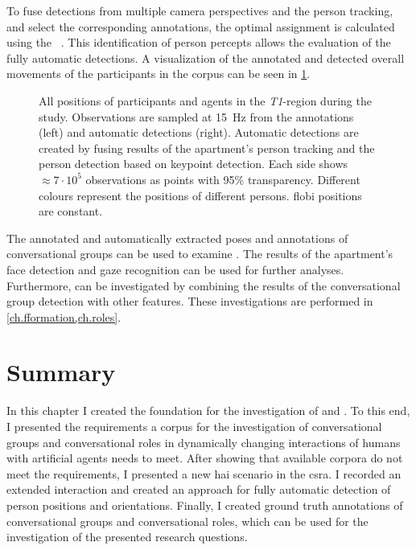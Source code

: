 To fuse detections from multiple camera perspectives and the person tracking, and select the corresponding annotations, the optimal assignment is calculated using the ~.
This identification of person percepts allows the evaluation of the fully automatic detections.
A visualization of the annotated and detected overall movements of the participants in the corpus can be seen in \cref{fig:group-person-movement}.
\begin{figure}[htb]
    \centering
    \def\svgwidth{1.0\textwidth}
    
    \caption[Movements in annotation and detection.]{\label{fig:group-person-movement}
    All positions of participants and agents in the \emph{T1}-region during the study.
    Observations are sampled at \SI{15}{\Hz} from the annotations (left) and automatic detections (right).
    Automatic detections are created by fusing results of the \gls{apartment}'s person tracking and the person detection based on  keypoint detection.
    Each side shows \(\approx7\cdot10^5\) observations as points with 95\% transparency.
    Different colours represent the positions of different persons.
    \Gls{flobi} positions are constant.
    }
\end{figure}

The annotated and automatically extracted poses and annotations of \glspl{conversational group} can be used to examine .
The results of the \gls{apartment}'s face detection and gaze recognition can be used for further analyses.
Furthermore,  can be investigated by combining the results of the \gls{conversational group} detection with other features.
These investigations are performed in \cref{ch.fformation,ch.roles}.

\section{Summary}\label{sec.group.corpus.summary}

In this chapter I created the foundation for the investigation of  and .
To this end, I presented the requirements a corpus for the investigation of \glspl{conversational group} and \glspl{conversational role} in dynamically changing interactions of humans with \glspl{artificial agent} needs to meet.
After showing that available corpora do not meet the requirements, I presented a new \gls{hai} scenario in the \gls{csra}.
I recorded an extended interaction and created an approach for fully automatic detection of person positions and orientations.
Finally, I created ground truth annotations of \glspl{conversational group} and \glspl{conversational role}, which can be used for the investigation of the presented research questions. 
